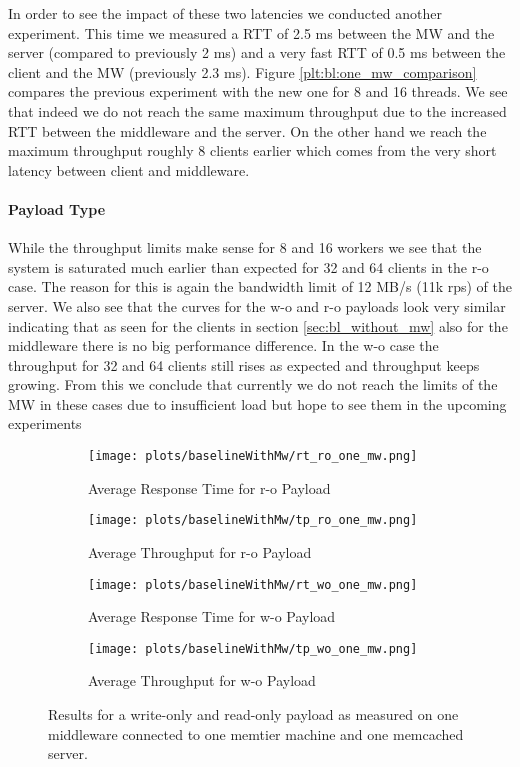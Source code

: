 \documentclass[11pt,a4paper]{article}
\begin{document}
In order to see the impact of these two latencies we conducted another experiment. This time we measured a RTT of 2.5 ms between the MW and the server (compared to previously 2 ms) and a very fast RTT of 0.5 ms between the client and the MW (previously 2.3 ms). Figure \ref{plt:bl:one_mw_comparison} compares the previous experiment with the new one for 8 and 16 threads. 
We see that indeed we do not reach the same maximum throughput due to the increased RTT between the middleware and the server. On the other hand we reach the maximum throughput roughly 8 clients earlier which comes from the very short latency between client and middleware. 

\paragraph{Payload Type}
While the throughput limits make sense for 8 and 16 workers we see that the system is saturated much earlier than expected for 32 and 64 clients in the r-o case. The reason for this is again the bandwidth limit of 12 MB/s (11k rps) of the server. We also see that the curves for the w-o and r-o payloads look very similar indicating that as seen for the clients in section \ref{sec:bl_without_mw} also for the middleware there is no big performance difference. In the w-o case the throughput for 32 and 64 clients still rises as expected and throughput keeps growing. From this we conclude that currently we do not reach the limits of the MW in these cases due to insufficient load but hope to see them in the upcoming experiments

\begin{figure}
\centering
\begin{subfigure}{.5\textwidth}
    \centering
    \texttt{[image: plots/baselineWithMw/rt\_ro\_one\_mw.png]}
    \caption{Average Response Time for r-o Payload }
    \label{plt:bl:rt_ro_one_mw}
\end{subfigure}%
\begin{subfigure}{.5\textwidth}
    \centering
    \texttt{[image: plots/baselineWithMw/tp\_ro\_one\_mw.png]}
    \caption{Average Throughput for r-o Payload}
    \label{plt:bl:tp_ro_one_mw}

\end{subfigure}
\begin{subfigure}{.5\textwidth}
    \centering
    \texttt{[image: plots/baselineWithMw/rt\_wo\_one\_mw.png]}
    \caption{Average Response Time for w-o Payload }
    \label{plt:bl:rt_wo_one_mw}
\end{subfigure}%
\begin{subfigure}{.5\textwidth}
    \centering
    \texttt{[image: plots/baselineWithMw/tp\_wo\_one\_mw.png]}
    \caption{Average Throughput for w-o Payload}
    \label{plt:bl:tp_wo_one_mw}

\end{subfigure}
\caption{Results for a write-only and read-only payload as measured on one middleware connected to one memtier machine and one memcached server.}
\label{plt:bl:one_mw}
\end{figure}
\end{document}
